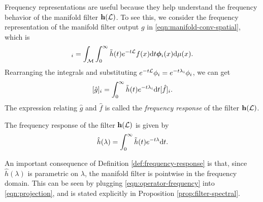 Frequency representations are useful because they help understand the frequency behavior of the manifold filter ${\mathbf h}({\mathcal L})$. To see this, we consider the frequency representation of the manifold filter output $g$ in \eqref{eqn:manifold-conv-spatial}, which is
\begin{equation}
    [\hat{g}]_i = \int_\ccalM \int_0^\infty \tdh(t) e^{-t\ccalL} f(x) \text{d} t \bm\phi_i(x) \text{d} \mu(x) \text{.}
\end{equation}
Rearranging the integrals and substituting $e^{-t{\mathcal L}}\phi_i = e^{-t\lambda_i}\phi_i$, we can get
\begin{equation}\label{eqn:projection}
    [\hat{g}]_i = \int_0^\infty {\ensuremath{\tilde h}}(t) e^{-t\lambda_i} \text{d}t  [\hat{f}]_i \text{.}
\end{equation}
The expression relating $\hat{g}$ and $\hat{f}$ is called the \emph{frequency response} of the filter ${\mathbf h}({\mathcal L})$. 


\begin{definition}
\label{def:frequency-response}
The frequency response of the filter ${\mathbf h}({\mathcal L})$ is given by
\begin{equation}\label{eqn:operator-frequency}
\hat{h}(\lambda)=\int_0^\infty {\ensuremath{\tilde h}}(t) e^{- t \lambda  }\text{d}t \text{.}
\end{equation}
\end{definition}

An important consequence of Definition \ref{def:frequency-response} is that, since $\hat{h}(\lambda)$ is parametric on $\lambda$, the manifold filter is pointwise in the frequency domain. This can be seen by plugging \eqref{eqn:operator-frequency} into \eqref{eqn:projection}, and is stated explicitly in Proposition \ref{prop:filter-spectral}.


%


